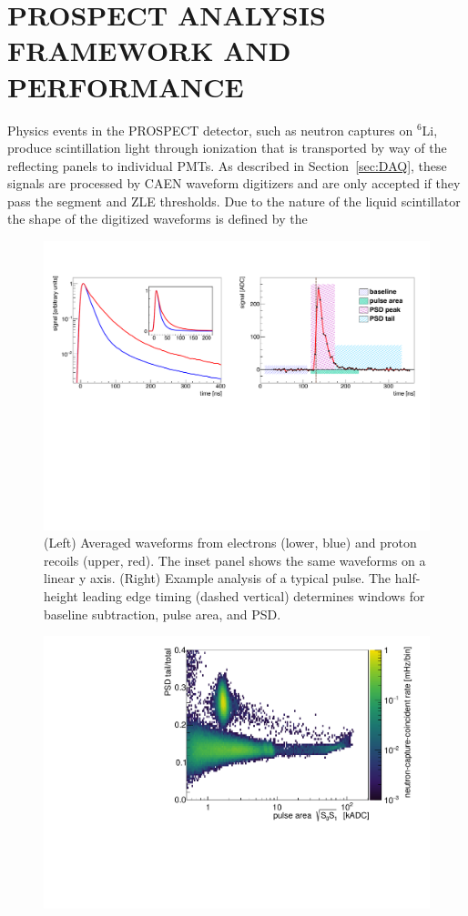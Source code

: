\chapter{\uppercase{PROSPECT Analysis Framework and Performance}}

Physics events in the PROSPECT detector, such as neutron captures on $^6$Li, produce scintillation light through ionization that is transported by way of the reflecting panels to individual PMTs. 
As described in Section~\ref{sec:DAQ}, these signals are processed by CAEN waveform digitizers and are only accepted if they pass the segment and ZLE thresholds.
Due to the nature of the liquid scintillator the shape of the digitized waveforms is defined by the 

\begin{figure}[h]
	\centering
	\includegraphics[width=0.99\linewidth]{tex/5-analysis-images/PSD_Define}
	\caption{(Left) Averaged waveforms from electrons (lower, blue) and proton recoils (upper, red). The inset panel shows the same waveforms on a linear y axis. (Right) Example analysis of a typical pulse. The half-height leading edge timing (dashed vertical) determines windows for baseline subtraction, pulse area, and PSD. }
	\label{fig:psddefine}
\end{figure}


\begin{figure}[h]
	\centering
	\includegraphics[width=0.7\linewidth]{tex/5-analysis-images/PSD_vs_S}
	\caption{}
	\label{fig:psdvss}
\end{figure}

